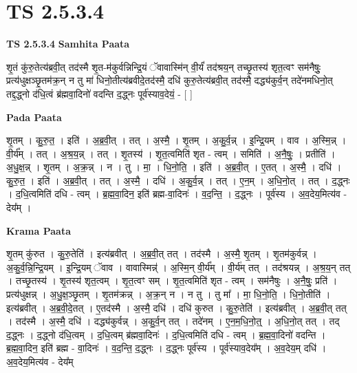 \documentclass[17pt]{extarticle}
\begin{document}
\section{ TS 2.5.3.4 }

\textbf{TS 2.5.3.4 } \newline
\textbf{Samhita Paata} \newline

शृ॒तं कु॑रु॒तेत्य॑ब्रवी॒त् तद॑स्मै शृ॒त-म॑कुर्वन्निन्द्रि॒यं ॅवावास्मि॑न् वी॒र्यं॑ तद॑श्रय॒न् तच्छृ॒तस्य॑ शृत॒त्वꣳ सम॑नैषुः॒ प्रत्य॑धुक्षञ्छृ॒तम॑क्र॒न् न तु मा॑ धिनो॒तीत्य॑ब्रवीदे॒तद॑स्मै॒ दधि॑ कुरु॒तेत्य॑ब्रवी॒त् तद॑स्मै॒ दद्ध्य॑कुर्व॒न् तदे॑नमधिनो॒त् तद्द॒द्ध्नो द॑धि॒त्वं ब्र॑ह्मवा॒दिनो॑ वदन्ति द॒द्ध्नः पूर्व॑स्याव॒देयं॒ - [  ] \newline

\textbf{Pada Paata} \newline

शृ॒तम् । कु॒रु॒त॒ । इति॑ । अ॒ब्र॒वी॒त् । तत् । अ॒स्मै॒ । शृ॒तम् । अ॒कु॒र्व॒न्न् । इ॒न्द्रि॒यम् । वाव । अ॒स्मि॒न्न् । वी॒र्य᳚म् । तत् । अ॒श्र॒य॒न्न् । तत् । शृ॒तस्य॑ । शृ॒त॒त्वमिति॑ शृत - त्वम् । समिति॑ । अ॒नै॒षुः॒ । प्रतीति॑ । अ॒धु॒क्ष॒न्न् । शृ॒तम् । अ॒क्र॒न्न् । न । तु । मा॒ । धि॒नो॒ति॒ । इति॑ । अ॒ब्र॒वी॒त् । ए॒तत् । अ॒स्मै॒ । दधि॑ । कु॒रु॒त॒ । इति॑ । अ॒ब्र॒वी॒त् । तत् । अ॒स्मै॒ । दधि॑ । अ॒कु॒र्व॒न्न् । तत् । ए॒न॒म् । अ॒धि॒नो॒त् । तत् । द॒द्ध्नः । द॒धि॒त्वमिति॑ दधि - त्वम् । ब्र॒ह्म॒वा॒दिन॒ इति॑ ब्रह्म-वा॒दिनः॑ । व॒द॒न्ति॒ । द॒द्ध्नः । पूर्व॑स्य । अ॒व॒देय॒मित्य॑व - देय᳚म् ।  \newline


\textbf{Krama Paata} \newline

शृ॒तम् कु॑रुत । कु॒रु॒तेति॑ । इत्य॑ब्रवीत् । अ॒ब्र॒वी॒त् तत् । तद॑स्मै । अ॒स्मै॒ शृ॒तम् । शृ॒तम॑कुर्वन्न् । अ॒कु॒र्व॒न्नि॒न्द्रि॒यम् । इ॒न्द्रि॒यम् ॅवाव । वावास्मिन्न्॑ । अ॒स्मि॒न् वी॒र्य᳚म् । वी॒र्य॑म् तत् । तद॑श्रयन्न् । अ॒श्र॒य॒न् तत् । तच्छृ॒तस्य॑ । शृ॒तस्य॑ शृत॒त्वम् । शृ॒त॒त्वꣳ सम् । शृ॒त॒त्वमिति॑ शृत - त्वम् । सम॑नैषुः । अ॒नै॒षुः॒ प्रति॑ । प्रत्य॑धुक्षन्न् । अ॒धु॒क्ष॒ञ्छृ॒तम् । शृ॒तम॑क्रन्न् । अ॒क्र॒न् न । न तु । तु मा᳚ । मा॒ धि॒नो॒ति॒ । धि॒नो॒तीति॑ । इत्य॑ब्रवीत् । अ॒ब्र॒वी॒दे॒तत् । ए॒तद॑स्मै । अ॒स्मै॒ दधि॑ । दधि॑ कुरुत । कु॒रु॒तेति॑ । इत्य॑ब्रवीत् । अ॒ब्र॒वी॒त् तत् । तद॑स्मै । अ॒स्मै॒ दधि॑ । दद्ध्य॑कुर्वन्न् । अ॒कु॒र्व॒न् तत् । तदे॑नम् । ए॒न॒म॒धि॒नो॒त्॒ । अ॒धि॒नो॒त् तत् । तद् द॒द्ध्नः । द॒द्ध्नो द॑धि॒त्वम् । द॒धि॒त्वम् ब्र॑ह्मवा॒दिनः॑ । द॒धि॒त्वमिति॑ दधि - त्वम् । ब्र॒ह्म॒वा॒दिनो॑ वदन्ति । ब्र॒ह्म॒वा॒दिन॒ इति॑ ब्रह्म - वा॒दिनः॑ । व॒द॒न्ति॒ द॒द्ध्नः । द॒द्ध्नः पूर्व॑स्य । पूर्व॑स्याव॒देय᳚म् । अ॒व॒देय॒म् दधि॑ । अ॒व॒देय॒मित्य॑व - देय᳚म् \newline
\end{document}
